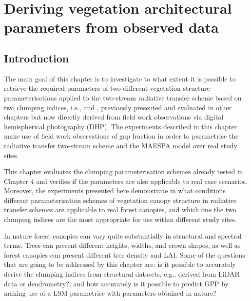 \documentclass[a4paper,11pt]{report}
\title{}
\author{Renato Kerches Braghiere \\ This document was written in \LaTeX \\ Number of words: 7617}
\date{\today}
\begin{document}
\maketitle
\setcounter{chapter}{4} %

\chapter{Deriving vegetation architectural parameters from observed data}

\section{Introduction}\label{introduction}

The main goal of this chapter is to investigate to what extent it is possible to retrieve the required parameters of two different vegetation structure parameterisations applied to the two-stream radiative transfer scheme based on two clumping indices, i.e., \citet{Nilson1971} and \citet{pinty2006}, previously presented and evaluated in other chapters but now directly derived from field work observations via digital hemispherical photography (DHP). The experiments described in this chapter make use of field work observations of gap fraction in order to parametrise the radiative transfer two-stream scheme and the MAESPA model over real study sites. 

This chapter evaluates the clumping parameterisation schemes already tested in Chapter 4 and verifies if the parameters are also applicable to real case scenarios. Moreover, the experiments presented here demonstrate in what conditions different parameterisation schemes of vegetation canopy structure in radiative transfer schemes are applicable to real forest canopies, and which one the two clumping indices are the most appropriate for use within different study sites.


In nature forest canopies can vary quite substantially in structural and spectral terms. Trees can present different heights, widths, and crown shapes, as well as forest canopies can present different tree density and LAI. Some of the questions that are going to be addressed by this chapter are: is it possible to accurately derive the clumping indices from structural datasets, e.g., derived from LiDAR data or dendrometry?; and how accurately is it possible to predict GPP by making use of a LSM parametrise with parameters obtained in nature?
\end{document}
